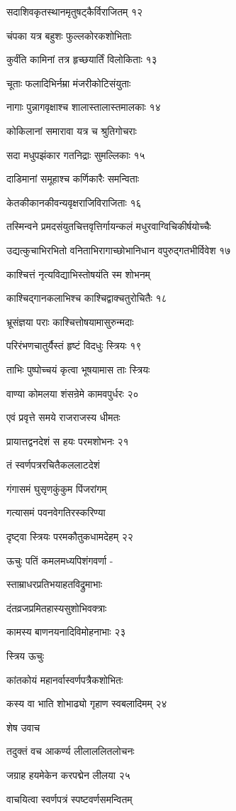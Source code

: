सदाशिवकृतस्थानमृतुषट्कैर्विराजितम् १२

चंपका यत्र बहुशः फुल्लकोरकशोभिताः

कुर्वंति कामिनां तत्र हृच्छयार्तिं विलोकिताः १३

चूताः फलादिभिर्नम्रा मंजरीकोटिसंयुताः

नागाः पुन्नागवृक्षाश्च शालास्तालास्तमालकाः १४

कोकिलानां समारावा यत्र च श्रुतिगोचराः

सदा मधुपझंकार गतनिद्राः सुमल्लिकाः १५

दाडिमानां समूहाश्च कर्णिकारैः समन्विताः

केतकीकानकीवन्यवृक्षराजिविराजिताः १६

तस्मिन्वने प्रमदसंयुतचित्तवृत्तिर्गायन्कलं मधुरवाग्विचिकीर्षयोच्चैः

उद्यत्कुचाभिरभितो वनिताभिरागाच्छोभानिधान वपुरुद्गतभीर्विवेश १७

काश्चित्तं नृत्यविद्याभिस्तोषयंति स्म शोभनम्

काश्चिद्गानकलाभिश्च काश्चिद्वाक्चतुरोचितैः १८

भ्रूसंज्ञया पराः काश्चित्तोषयामासुरुन्मदाः

परिरंभणचातुर्यैस्तं हृष्टं विदधुः स्त्रियः १९

ताभिः पुष्पोच्चयं कृत्वा भूषयामास ताः स्त्रियः

वाण्या कोमलया शंसन्रेमे कामवपुर्धरः २०

एवं प्रवृत्ते समये राजराजस्य धीमतः

प्रायात्तद्वनदेशं स हयः परमशोभनः २१

तं स्वर्णपत्ररचितैकललाटदेशं

गंगासमं घुसृणकुंकुम पिंजरांगम्

गत्यासमं पवनवेगतिरस्करिण्या

दृष्ट्वा स्त्रियः परमकौतुकधामदेहम् २२

ऊचुः पतिं कमलमध्यपिशंगवर्णा -

स्ताम्राधरप्रतिभयाहतविद्रुमाभाः

दंतव्रजप्रमितहास्यसुशोभिवक्त्राः

कामस्य बाणनयनादिविमोहनाभाः २३

स्त्रिय ऊचुः

कांतकोयं महानर्वास्वर्णपत्रैकशोभितः

कस्य वा भाति शोभाढ्यो गृहाण स्वबलादिमम् २४

शेष उवाच

तदुक्तं वच आकर्ण्य लीलाललितलोचनः

जग्राह हयमेकेन करपद्मेन लीलया २५

वाचयित्वा स्वर्णपत्रं स्पष्टवर्णसमन्वितम्

